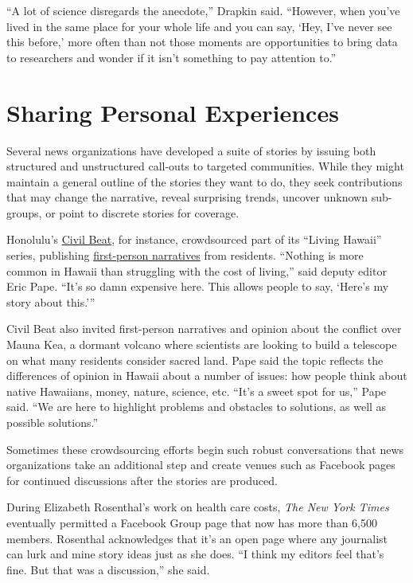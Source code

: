 \documentclass[notoc, symmetric, nobib, nols]{towcenter-guideto-book}
\begin{document}
``A lot of science disregards the anecdote,'' Drapkin said. ``However, when you've lived in the same place for your whole life and you can say, ‘Hey, I've never see this before,' more often than not those moments are opportunities to bring data to researchers and wonder if it isn't something to pay attention to.'' 

\section{ Sharing Personal Experiences}
 
Several news organizations have developed a suite of stories by issuing both structured and unstructured call-outs to targeted communities. While they might maintain a general outline of the stories they want to do, they seek contributions that may change the narrative, reveal surprising trends, uncover unknown sub-groups, or point to discrete stories for coverage. 

Honolulu's \href{http://www.civilbeat.com/projects/living-hawaii/}{Civil Beat}, for instance, crowdsourced part of its “Living Hawaii” series, publishing \href{http://www.civilbeat.com/projects/living-hawaii/%5D}{first-person narratives} from residents. ``Nothing is more common in Hawaii than struggling with the cost of living,'' said deputy editor Eric Pape. ``It's so damn expensive here. This allows people to say, `Here's my story about this.''' %

Civil Beat also invited first-person narratives and opinion about the conflict over Mauna Kea, a dormant volcano where scientists are looking to build a telescope on what many residents consider sacred land. Pape said the topic reflects the differences of opinion in Hawaii about a number of issues: how people think about native Hawaiians, money, nature, science, etc. “It's a sweet spot for us,” Pape said. ``We are here to highlight problems and obstacles to solutions, as well as possible solutions.'' %

Sometimes these crowdsourcing efforts begin such robust conversations that news organizations take an additional step and create venues such as Facebook pages for continued discussions after the stories are produced.

During Elizabeth Rosenthal's work on health care costs, \textit{The New York Times} eventually permitted a Facebook Group page that now has more than 6,500 members. Rosenthal acknowledges that it's an open page where any journalist can lurk and mine story ideas just as she does. ``I think my editors feel that's fine. But that was a discussion,'' she said.%
\end{document}
